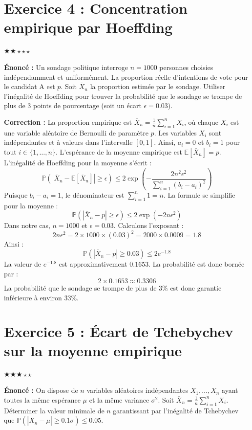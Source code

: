\documentclass[11pt,a4paper]{article}
\begin{document}
\section*{Exercice 4 : Concentration empirique par Hoeffding}

$\bigstar\bigstar\star\star\star$

\textbf{Énoncé :}
Un sondage politique interroge $n = 1000$ personnes choisies indépendamment et uniformément. La proportion réelle d'intentions de vote pour le candidat A est $p$. Soit $\overline{X}_n$ la proportion estimée par le sondage.
Utiliser l'inégalité de Hoeffding pour trouver la probabilité que le sondage se trompe de plus de $3$ points de pourcentage (soit un écart $\epsilon = 0.03$).

\textbf{Correction :}
La proportion empirique est $\overline{X}_n = \frac{1}{n} \sum_{i=1}^n X_i$, où chaque $X_i$ est une variable aléatoire de Bernoulli de paramètre $p$. Les variables $X_i$ sont indépendantes et à valeurs dans l'intervalle $[0, 1]$.
Ainsi, $a_i = 0$ et $b_i = 1$ pour tout $i \in \{1, \dots, n\}$.
L'espérance de la moyenne empirique est $\mathbb{E}[\overline{X}_n] = p$.
L'inégalité de Hoeffding pour la moyenne s'écrit :
$$ \mathbb{P}(|\overline{X}_n - \mathbb{E}[\overline{X}_n]| \ge \epsilon) \le 2 \exp\left( - \frac{2 n^2 \epsilon^2}{\sum_{i=1}^n (b_i - a_i)^2} \right) $$
Puisque $b_i - a_i = 1$, le dénominateur est $\sum_{i=1}^n 1 = n$.
La formule se simplifie pour la moyenne :
$$ \mathbb{P}(|\overline{X}_n - p| \ge \epsilon) \le 2 \exp(-2 n \epsilon^2) $$
Dans notre cas, $n = 1000$ et $\epsilon = 0.03$.
Calculons l'exposant :
$$ 2 n \epsilon^2 = 2 \times 1000 \times (0.03)^2 = 2000 \times 0.0009 = 1.8 $$
Ainsi :
$$ \mathbb{P}(|\overline{X}_n - p| \ge 0.03) \le 2 e^{-1.8} $$
La valeur de $e^{-1.8}$ est approximativement $0.1653$.
La probabilité est donc bornée par :
$$ 2 \times 0.1653 \approx 0.3306 $$
La probabilité que le sondage se trompe de plus de $3\%$ est donc garantie inférieure à environ $33\%$.


\section*{Exercice 5 : Écart de Tchebychev sur la moyenne empirique}

$\bigstar\bigstar\bigstar\star\star$

\textbf{Énoncé :}
On dispose de $n$ variables aléatoires indépendantes $X_1, \dots, X_n$ ayant toutes la même espérance $\mu$ et la même variance $\sigma^2$. Soit $\overline{X}_n = \frac{1}{n} \sum_{i=1}^n X_i$.
Déterminer la valeur minimale de $n$ garantissant par l'inégalité de Tchebychev que $\mathbb{P}(|\overline{X}_n - \mu| \ge 0.1\sigma) \le 0.05$.
\end{document}
